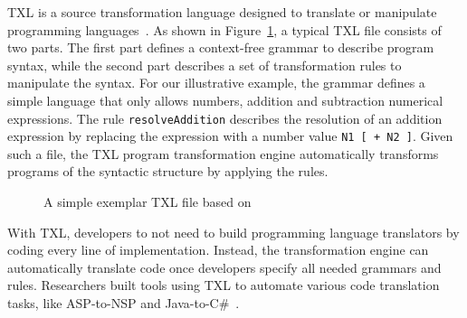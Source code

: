 \documentclass[runningheads,a4paper]{llncs}
\newcommand{\codefont}[1]{\footnotesize{\texttt{#1}}\normalsize}
\begin{document}

TXL is a source transformation language designed to translate or manipulate programming languages~\cite{Cordy2006}. As shown in Figure~\ref{fig:txl}, a typical TXL file consists of two parts. The first part defines a context-free grammar to describe program syntax, while the second part describes a set of transformation rules to manipulate the syntax. For our illustrative example, the grammar defines a simple language that only allows numbers, addition and subtraction numerical expressions. The rule \codefont{resolveAddition} describes the resolution of an addition expression by replacing the expression with a number value \codefont{N1 [ + N2 ]}. Given such a file, the TXL program transformation engine automatically transforms programs of the syntactic structure by applying the rules. 

\begin{figure}
\centering
{}
\caption{A simple exemplar TXL file based on~\cite{txltour}}
\label{fig:txl}
\end{figure}
With TXL, developers to not need to build programming language translators by coding every line of implementation. Instead, the transformation engine can automatically translate code once developers specify all needed grammars and rules. Researchers built tools using TXL to automate various code translation tasks, like ASP-to-NSP and Java-to-C\#~\cite{Chu:08,Hassan:2005,El-Ramly:2006,Tonella:04}.
\end{document}
